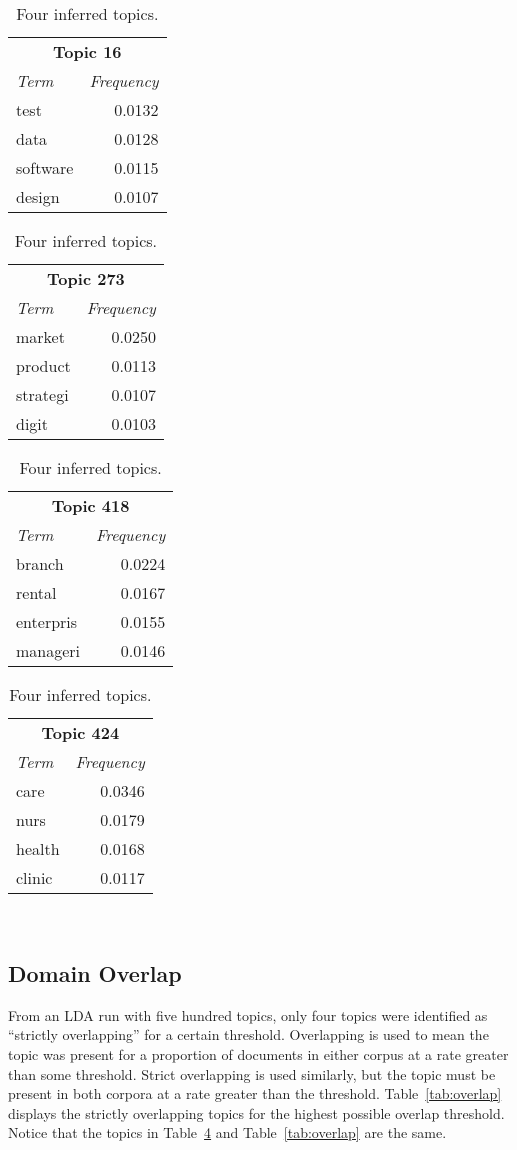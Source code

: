 \begin{table}
  \centering
  \begin{tabular}{l r}
    \multicolumn{2}{c}{\small{\textbf{Topic 16}}} \\
    {\small\textit{Term}} & {\small\textit{Frequency}} \\
    \hline
    test & 0.0132 \\
    data & 0.0128 \\
    software & 0.0115 \\
    design & 0.0107
  \end{tabular}
  \begin{tabular}{l r}
    \multicolumn{2}{c}{\small{\textbf{Topic 273}}} \\
    {\small\textit{Term}} & {\small\textit{Frequency}} \\
    \hline
    market & 0.0250 \\
    product & 0.0113 \\
    strategi & 0.0107 \\
    digit & 0.0103
  \end{tabular}
  \begin{tabular}{l r}
    \multicolumn{2}{c}{\small{\textbf{Topic 418}}} \\
    {\small\textit{Term}} & {\small\textit{Frequency}} \\
    \hline
    branch & 0.0224 \\
    rental & 0.0167 \\
    enterpris & 0.0155 \\
    manageri & 0.0146
  \end{tabular}
  \begin{tabular}{l r}
    \multicolumn{2}{c}{\small{\textbf{Topic 424}}} \\
    {\small\textit{Term}} & {\small\textit{Frequency}} \\
    \hline
    care & 0.0346 \\
    nurs & 0.0179 \\
    health & 0.0168 \\
    clinic & 0.0117
  \end{tabular}
  \caption{Four inferred topics.}~\label{tab:topics}
\end{table}

\subsection{Domain Overlap}

From an LDA run with five hundred topics, only four topics were identified as ``strictly overlapping'' for a certain threshold.
Overlapping is used to mean the topic was present for a proportion of documents in either corpus at a rate greater than some threshold.
Strict overlapping is used similarly, but the topic must be present in both corpora at a rate greater than the threshold.
Table~\ref{tab:overlap} displays the strictly overlapping topics for the highest possible overlap threshold.
Notice that the topics in Table~\ref{tab:topics} and Table~\ref{tab:overlap} are the same.

